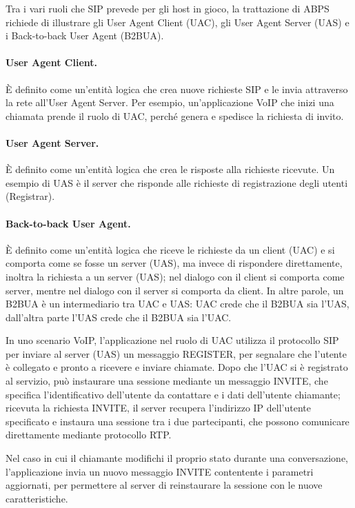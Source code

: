 \documentclass[12pt,a4paper,openright,twoside]{book}
\begin{document}
Tra i vari ruoli che SIP prevede per gli host in gioco, la trattazione
di ABPS richiede di illustrare gli User Agent Client (UAC), gli User
Agent Server (UAS) e i Back-to-back User Agent (B2BUA).

\paragraph{User Agent Client.}
È definito come un'entità logica che crea nuove richieste SIP e le
invia attraverso la rete all'User Agent Server. Per esempio,
un'applicazione VoIP che inizi una chiamata prende il ruolo di UAC,
perché genera e spedisce la richiesta di invito.

\paragraph{User Agent Server.}
È definito come un'entità logica che crea le risposte alla richieste
ricevute. Un esempio di UAS è il server che risponde alle richieste di
registrazione degli utenti (Registrar).

\paragraph{Back-to-back User Agent.}
È definito come un'entità logica che riceve le richieste da un client
(UAC) e si comporta come se fosse un server (UAS), ma invece di
rispondere direttamente, inoltra la richiesta a un server (UAS); nel
dialogo con il client si comporta come server, mentre nel dialogo con
il server si comporta da client. In altre parole, un B2BUA è un
intermediario tra UAC e UAS: UAC crede che il B2BUA sia l'UAS,
dall'altra parte l'UAS crede che il B2BUA sia l'UAC.

In uno scenario VoIP, l'applicazione nel ruolo di UAC utilizza il
protocollo SIP per inviare al server (UAS) un messaggio REGISTER, per
segnalare che l'utente è collegato e pronto a ricevere e inviare
chiamate. Dopo che l'UAC si è registrato al servizio, può instaurare
una sessione mediante un messaggio INVITE, che specifica
l'identificativo dell'utente da contattare e i dati dell'utente
chiamante; ricevuta la richiesta INVITE, il server recupera
l'indirizzo IP dell'utente specificato e instaura una sessione tra i
due partecipanti, che possono comunicare direttamente mediante
protocollo RTP.

Nel caso in cui il chiamante modifichi il proprio stato durante una
conversazione, l'applicazione invia un nuovo messaggio INVITE
contentente i parametri aggiornati, per permettere al server di
reinstaurare la sessione con le nuove caratteristiche.
\end{document}
